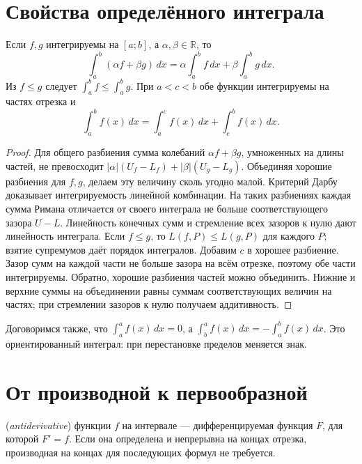 \section{Свойства определённого интеграла}
\begin{theorem}\label{thm:legacy-c29-4}
Если \(f,g\) интегрируемы на \([a;b]\), а \(\alpha,\beta\in\mathbb R\), то
\[
\int_a^b(\alpha f+\beta g)\,dx
=\alpha\int_a^b f\,dx+\beta\int_a^b g\,dx.
\]
Из \(f\le g\) следует \(\int_a^b f\le\int_a^b g\). При \(a<c<b\) обе функции интегрируемы на частях отрезка и
\[
\int_a^b f(x)\,dx=\int_a^c f(x)\,dx+\int_c^b f(x)\,dx.
\]
\end{theorem}
\begin{proof}
Для общего разбиения сумма колебаний \(\alpha f+\beta g\), умноженных на длины частей, не превосходит \(|\alpha|(U_f-L_f)+|\beta|(U_g-L_g)\). Объединяя хорошие разбиения для \(f,g\), делаем эту величину сколь угодно малой. Критерий Дарбу доказывает интегрируемость линейной комбинации. На таких разбиениях каждая сумма Римана отличается от своего интеграла не больше соответствующего зазора \(U-L\). Линейность конечных сумм и стремление всех зазоров к нулю дают линейность интеграла.
Если \(f\le g\), то \(L(f,P)\le L(g,P)\) для каждого \(P\); взятие супремумов даёт порядок интегралов.
Добавим \(c\) в хорошее разбиение. Зазор сумм на каждой части не больше зазора на всём отрезке, поэтому обе части интегрируемы. Обратно, хорошие разбиения частей можно объединить. Нижние и верхние суммы на объединении равны суммам соответствующих величин на частях; при стремлении зазоров к нулю получаем аддитивность.
\end{proof}
Договоримся также, что \(\int_a^a f(x)\,dx=0\), а \(\int_b^a f(x)\,dx=-\int_a^b f(x)\,dx\). Это ориентированный интеграл: при перестановке пределов меняется знак.

\section{От производной к первообразной}
\begin{definition}
 (\emph{antiderivative}) функции \(f\) на интервале — дифференцируемая функция \(F\), для которой \(F'=f\). Если она определена и непрерывна на концах отрезка, производная на концах для последующих формул не требуется.
\end{definition}

